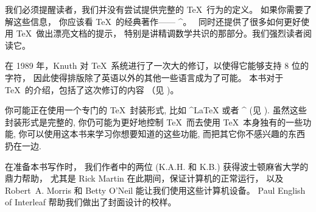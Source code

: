 
我们必须提醒读者，我们并没有尝试提供完整的 \TeX\ 行为的定义。
如果你需要了解这些信息， 你应该看 \TeX\ 的经典著作—— ^{\texbook}。
\texbook\ 同时还提供了很多如何更好使用 \TeX\ 做出漂亮文档的提示，
特别是讲精调数学共识的那部分。我们强烈读者阅读它。


在 1989 年，Knuth 对 \TeX\ 系统进行了一次大的修订，以使得它能够支持 $8$ 位的字符，
因此使得排版除了英语以外的其他一些语言成为了可能。
本书对于 \TeX\ 的介绍，包括了这次修订的内容 （见 )。

{\tighten 你可能正在使用一个专门的 \TeX\ 封装形式,
比如 ^{\LaTeX} 或者 ^{\AMSTeX} (见 ).
虽然这些封装形式是完整的, 你仍可能为更好地控制 \TeX\ 而去使用 \TeX\ 本身独有的一些功能,
你可以使用这本书来学习你想要知道的这些功能,
而把其它你不感兴趣的东西扔在一边.\par}


在准备本书写作时，
我们作者中的两位 (K.A.H. 和 K.B.) 获得波士顿麻省大学的鼎力帮助，
尤其是 Rick Martin 在此期间，保证计算机的正常运行，
以及 Robert~A. Morris 和 Betty O'Neil 能让我们使用这些计算机设备。
Paul English of Interleaf 帮助我们做出了封面设计的校样。



